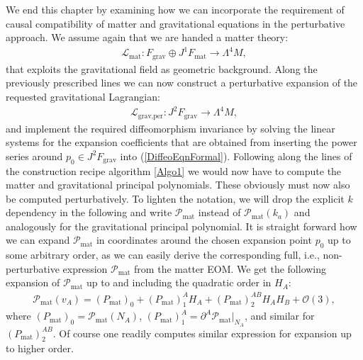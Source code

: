 We end this chapter by examining how we can incorporate the requirement of causal compatibility of matter and gravitational equations in the perturbative approach.
We assume again that we are handed a matter theory: 
\begin{align}
    \mathcal{L}_{\text{mat}} : F_{\text{grav}} \oplus J^1F_{\text{mat}} \longrightarrow \Lambda^4M,
\end{align}
that exploits the gravitational field as geometric background. Along the previously prescribed lines we can now construct a perturbative expansion of the requested gravitational Lagrangian:
\begin{align}
    \mathcal{L}_{\text{grav,per}} : J^2F_{\text{grav}} \longrightarrow \Lambda^4M,
\end{align}
and implement the required diffeomorphism invariance by solving the linear systems for the expansion coefficients that are obtained from inserting the power series around $p_0 \in J^2F_{\text{grav}}$ into (\ref{DiffeoEqnFormal}). 
Following along the lines of the construction recipe algorithm \ref{Algo1} we would now have to compute the matter and gravitational principal polynomials.
These obviously must now also be computed perturbatively. 
To lighten the notation, we will drop the explicit $k$ dependency in the following and write $\mathcal{P}_{\text{mat}}$ instead of $\mathcal{P}_{\text{mat}}(k_a)$ and analogously for the gravitational principal polynomial. It is straight forward how we can expand $\mathcal{P}_{\text{mat}}$ in coordinates around the chosen expansion point $p_0$ up to some arbitrary order, as we can easily derive the corresponding full, i.e., non-perturbative expression $\mathcal{P}_{\text{mat}}$ from the matter EOM. We get the following expansion of $\mathcal{P}_{\text{mat}}$ up to and including the quadratic order in $H_A$:
\begin{align}
    \mathcal{P}_{\text{mat}}(v_A) = (P_{\text{mat}})_{0} + (P_{\text{mat}})^A_1 H_A+ (P_{\text{mat}})^{AB}_2 H_A H_B +\mathcal{O}(3),
\end{align}
where $(P_{\text{mat}})_0 = \mathcal{P}_{\text{mat}}(N_A)$, $(P_{\text{mat}})_1^A = \partial^A \mathcal{P}_{\text{mat}} \vert _{N_A}$, and similar for $(P_{\text{mat}})^{AB}_2$. Of course one readily computes similar expression for expansion up to higher order. 

